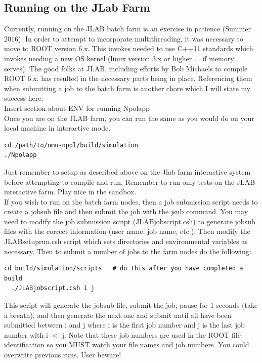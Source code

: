 \documentclass[10pt,titlepage]{article}
\begin{document}
\subsection{Running on the JLab Farm}
Currently, running on the JLAB batch farm is an exercise in patience (Summer 2016). In order to attempt to incorporate multithreading, it was necessary to move to ROOT version 6.x.  This invokes needed to use C++11 standards which invokes needing a new OS kernel (linux version 3.x or higher ... if memory serves). The good folks at JLAB, including efforts by Bob Michaels to compile ROOT 6.x, has resulted in the necessary parts being in place.  Referencing them when submitting a job to the batch farm is another chore which I will state my success here. \\

Insert section about ENV for running Npolapp \\

Once you are on the JLAB farm, you can run the same as you would do on your local machine in interactive mode.
\begin{lstlisting}[frame=single]
cd /path/to/nmu-npol/build/simulation
./Npolapp
\end{lstlisting}
Just remember to setup as described above on the Jlab farm interactive system before attempting to compile and run.  Remember to run only tests on the JLAB interactive farm.  Play nice in the sandbox. \\

If you wish to run on the batch farm nodes, then a job submission script needs to create a jobsub file and then submit the job with the jsub command. You may need to modify the job submission script (JLABjobscript.csh) to generate jobsub files with the correct information (user name, job name, etc.). Then modify the JLABsetuprun.csh script which sets directories and environmental variables as necessary. Then to submit a number of jobs to the farm nodes do the following:
\begin{lstlisting}[frame=single]
  cd build/simulation/scripts	# do this after you have completed a build
  ./JLABjobscript.csh i j
\end{lstlisting}
This script will generate the jobsub file, submit the job, pause for 1 seconds (take a breath), and then generate the next one and submit until all have been submitted between i and j where i is the first job number and j is the last job number with i $<$ j.  Note that these job numbers are used in the ROOT file identification so you MUST watch your file names and job numbers. You could overwrite previous runs. User beware! \\
	 
\end{document}
